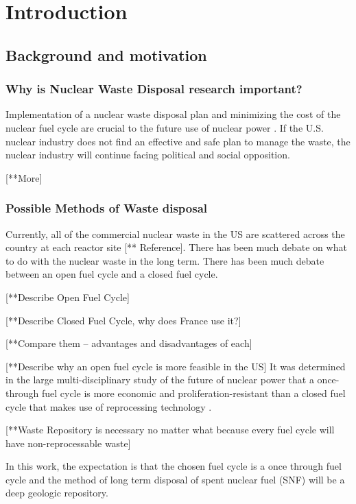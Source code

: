 \chapter[Introduction]{Introduction}

\section{Background and motivation}
\subsection{Why is Nuclear Waste Disposal research important?}
Implementation of a nuclear waste disposal plan and minimizing the 
cost of the nuclear fuel cycle are crucial to the future use of 
nuclear power 
\cite{massachusetts_institute_of_technology_future_2003}. 
If the U.S. nuclear industry does not find an effective and safe 
plan to manage the waste, the nuclear industry will continue facing 
political and social opposition. 

[**More]

\subsection{Possible Methods of Waste disposal}
Currently, all of the commercial nuclear waste in the \gls{US} are 
scattered across the country at each reactor site [** Reference]. 
There has been much debate on what to do with the nuclear waste in 
the long term. 
There has been much debate between an open fuel cycle and a closed 
fuel cycle. 

[**Describe Open Fuel Cycle]

[**Describe Closed Fuel Cycle, why does France use it?]

[**Compare them -- advantages and disadvantages of each]

[**Describe why an open fuel cycle is more feasible in the US]
It was determined in the large multi-disciplinary study of the 
future of nuclear power that a once-through fuel cycle is more 
economic and proliferation-resistant than a closed fuel cycle that
makes use of reprocessing technology
\cite{massachusetts_institute_of_technology_future_2003}.

[**Waste Repository is necessary no matter what because every 
fuel cycle will have non-reprocessable waste]

In this work, the expectation is that the chosen fuel cycle is a 
once through fuel cycle and the method of long term disposal of 
spent nuclear fuel (SNF) will be a deep geologic repository. 

